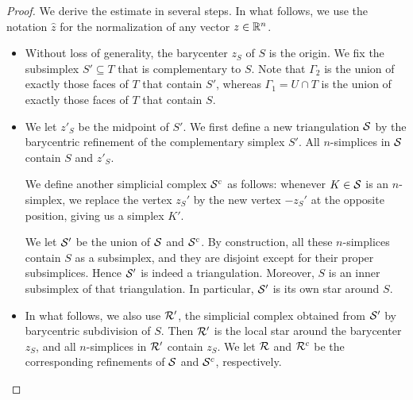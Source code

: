 \documentclass[10pt,letterpaper]{article}
\begin{document}
\begin{proof}
    We derive the estimate in several steps. 
    In what follows, we use the notation $\hat z$ for the normalization of any vector $z \in {\mathbb R}^{n}$.
    \begin{itemize}
        \item 
        Without loss of generality, the barycenter $z_{S}$ of $S$ is the origin. 
        We fix the subsimplex $S' \subseteq T$ that is complementary to $S$.
        Note that ${\Gamma_2}$ is the union of exactly those faces of $T$ that contain $S'$,
        whereas ${\Gamma_1} = U \cap T$ is the union of exactly those faces of $T$ that contain $S$. 
        
        
        \item 
        We let $z'_{S}$ be the midpoint of $S'$. 
        We first define a new triangulation ${\mathcal S}$ by the barycentric refinement of the complementary simplex $S'$. 
        All $n$-simplices in ${\mathcal S}$ contain $S$ and $z'_{S}$.
        
        We define another simplicial complex ${\mathcal S}^c$ as follows:
        whenever $K \in {\mathcal S}$ is an $n$-simplex, 
        we replace the vertex $z_{S}'$ by the new vertex $-z_{S}'$ at the opposite position,
        giving us a simplex $K'$. 
        
        We let ${\mathcal S}'$ be the union of ${\mathcal S}$ and ${\mathcal S}^c$. 
        By construction, all these $n$-simplices contain $S$ as a subsimplex,
        and they are disjoint except for their proper subsimplices. 
        Hence ${\mathcal S}'$ is indeed a triangulation. 
        Moreover, $S$ is an inner subsimplex of that triangulation. 
        In particular, ${\mathcal S}'$ is its own star around $S$.
        
        
        \item 
        In what follows, we also use ${\mathcal R}'$, 
        the simplicial complex obtained from ${\mathcal S}'$ by barycentric subdivision of $S$.
        Then ${\mathcal R}'$ is the local star around the barycenter $z_S$,
        and all $n$-simplices in ${\mathcal R}'$ contain $z_{S}$. 
        We let ${\mathcal R}$ and ${\mathcal R}^{c}$ be the corresponding refinements of ${\mathcal S}$ and ${\mathcal S}^{c}$, respectively.
        

\end{itemize}
\end{proof}
\end{document}
